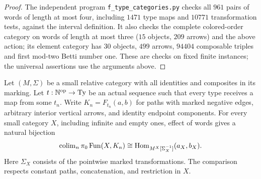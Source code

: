 \begin{proof}
The independent program \texttt{f\_type\_categories.py} checks all
$961$ pairs of words of length at most four, including $1471$ type
maps and $10771$ transformation tests, against the interval definition.
It also checks the complete colored-order category on words of length
at most three ($15$ objects, $209$ arrows) and the above action; its
element category has $30$ objects, $499$ arrows, $94404$ composable
triples and first mod-two Betti number one. These are checks on fixed
finite instances; the universal assertions use the arguments above.
\end{proof}

\begin{proposition}
\label{F:C20-paths}
Let $(M,\Sigma)$ be a small relative category with all identities and
composites in its marking. Let $t:\mathbb N^{\mathrm {op}}\to\mathrm{Ty}$ be an actual
sequence such that every type receives a map from some $t_n$.
Write $K_n=F_{t_n}(a,b)$ for paths with marked negative edges, arbitrary
interior vertical arrows, and identity endpoint components. For every
small category $X$, including infinite and empty ones, effect of words
gives a natural bijection
\[
 \operatorname{colim}_n\pi_0\operatorname{Fun}(X,K_n)
 \cong
 \operatorname{Hom}_{M^X[\Sigma_X^{-1}]}(a_X,b_X).
\]
Here $\Sigma_X$ consists of the pointwise marked transformations.
The comparison respects constant paths, concatenation, and restriction
in $X$.
\end{proposition}
